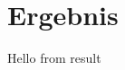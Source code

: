 \documentclass[.../Dokumentation.tex]{subfile}
\begin{document}
    \section{Ergebnis}\label{sec-result}
    Hello from result
\end{document}
